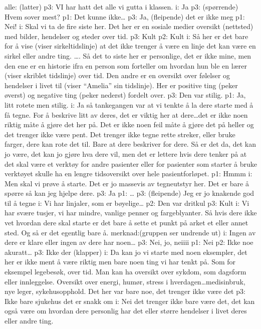 \documentclass[11pt,UKenglish, a4paper]{article}
\begin{document}
alle: (latter)
p3: VI har hatt det alle vi gutta i klassen.
i: Ja
p3: (spørrende) Hvem sover mest?
p1: Det kunne ikke\dots
p3: Ja, (fleipende) det er ikke meg
p1: Nei!
i: Skal vi ta de fire siste her. Det her er en sosiale medier oversikt (nettsted) med bilder, hendelser og steder over tid.
p3: Kult
p2: Kult
i: Så her er det bare for å vise (viser sirkeltidslinje) at det ikke trenger å være en linje det kan være en sirkel eller andre ting. \dots. Så det to siste her er personlige, det er ikke mine, men den ene er en historie ifra en person som forteller om hvordan hun ble en lærer (viser skriblet tidslinje) over tid. Den andre er en oversikt over følelser og hendelser i livet til (viser ``Amelia'' sin tidslinje). Her er positive ting (peker øverst) og negative ting (peker nederst) fordelt over.
p3: Den var stilig.
p1: Ja, litt rotete men stilig.
i: Ja så tankegangen var at vi tenkte å la dere starte med å få tegne. For å beskrive litt av deres, det er viktig her at dere\dots det er ikke noen riktig måte å gjøre det her på. Det er ikke noen feil måte å gjøre det på heller og det trenger ikke være pent. Det trenger ikke tegne rette streker, eller bruke farger, dere kan rote det til. Bare at dere beskriver for dere. Så er det da, det kan jo være, det kan jo gjøre hva dere vil, men det er lettere hvis dere tenker på at det skal være et verktøy for andre pasienter eller for pasienter som starter å bruke verktøyet skulle ha en lengre tidsoversikt over hele pasientforløpet. 
p1: Hmmm
i: Men skal vi prøve å starte. Det er jo massevis av tegneutstyr her. Det er bare å spørre så kan jeg hjelpe dere. 
p3: Ja
p1: \dots
p3: (fleipende) Jeg er jo knakende god til å tegne
i: Vi har linjaler, som er bøyelige\dots
p2: Den var dritkul
p3: Kult
i: Vi har svære tusjer, vi har mindre, vanlige penner og fargeblyanter. Så hvis dere ikke vet hvordan dere skal starte er det bare å sette et punkt på arket et eller annet sted. Og så er det egentlig bare å. 
merknad:(gruppen ser undrende ut)
i: Ingen av dere er klare eller ingen av dere har noen\dots
p3: Nei, jo, neiiii 
p1: Nei
p2: Ikke noe akuratt\dots
p3: Ikke der (klapper)
i: Da kan jo vi starte med noen eksempler, det her er ikke ment å være riktig men bare noen ting vi har tenkt på. Som for eksempel legebesøk, over tid. Man kan ha oversikt over sykdom, som dagsform eller innleggelse. Oversikt over energi, humør, stress i hverdagen\dots medisinbruk, nye leger, sykehusopphold. Det her var bare noe, det trenger ikke være det
p3: Ikke bare sjukehus det er snakk om
i: Nei det trenger ikke bare være det, det kan også være om hvordan dere personlig har det eller større hendelser i livet deres eller andre ting. 
\end{document}
